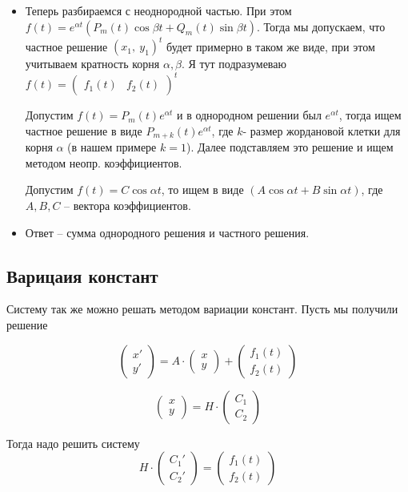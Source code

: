 \documentclass[11pt]{article}
\begin{document}
\begin{itemize}
		\item Теперь разбираемся с неоднородной частью. При этом $f(t) = e^{\alpha t}(P_m(t)\cos \beta t + Q_m(t)\sin \beta t)$. 
		Тогда мы допускаем, что частное решение $(x_1, \ y_1)^t$ будет примерно в таком же виде, при этом учитываем кратность корня $\alpha, \beta$. Я тут подразумеваю $f(t) = \begin{pmatrix}
			f_1(t) & f_2(t)
		\end{pmatrix}^t$

		Допустим $f(t) = P_m(t)e^{\alpha t}$ и в однородном решении был $e^{\alpha t}$, тогда ищем частное решение в виде $P_{m + k}(t)e^{\alpha t}$, где $k$- размер жордановой
		клетки для корня $\alpha$ (в нашем примере $k = 1$). Далее подставляем это решение и ищем методом неопр. коэффициентов.

		Допустим $f(t) = C\cos \alpha t$, то ищем в виде $(A \cos \alpha t + B \sin \alpha t)$, где $A, B, C$ -- вектора коэффициентов. 

		\item Ответ -- сумма однородного решения и частного решения.
	\end{itemize}

	\subsection{Варицаия констант}
	
	Систему так же можно решать методом вариации констант. Пусть мы получили решение 
	
	$$\begin{pmatrix}
	x'\\
	y'
	\end{pmatrix}= A \cdot
	\begin{pmatrix}
	x\\
	y
	\end{pmatrix} +
	\begin{pmatrix}
	f_1(t)\\
	f_2(t)
	\end{pmatrix}$$
	
	$$\begin{pmatrix}
	x\\
	y
	\end{pmatrix}= H \cdot
	\begin{pmatrix}
	C_1\\
	C_2
	\end{pmatrix}$$
	
	Тогда надо решить систему 
	$$H \cdot
	\begin{pmatrix}
	C_1'\\
	C_2'
	\end{pmatrix} = \begin{pmatrix}
	f_1(t)\\
	f_2(t)
	\end{pmatrix}$$
	
\end{document}
